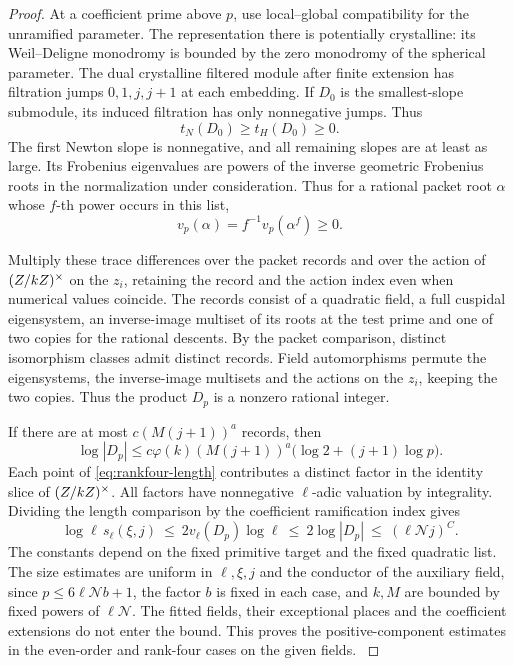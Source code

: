 \begin{proof}
At a coefficient prime
above \(p\), use local--global compatibility for the unramified
parameter. The representation there is potentially crystalline:
its Weil--Deligne monodromy is bounded by the zero monodromy
of the spherical parameter. The dual crystalline filtered
module after finite extension has filtration jumps \(0,1,j,j+1\)
at each embedding. If \(D_0\) is the smallest-slope submodule, its induced filtration has only nonnegative jumps. Thus
\[
 t_N(D_0)\ge t_H(D_0)\ge0 .
\]
The first Newton slope is nonnegative, and all remaining slopes are at least as large. Its Frobenius
eigenvalues are powers of the inverse geometric Frobenius
roots in the normalization under consideration. Thus for a rational packet root \(\alpha\) whose \(f\)-th power occurs in this list,
\[
 v_p(\alpha)=f^{-1}v_p(\alpha^f)\ge0.
\]

\hfill\mbox{\cite{tadic,blggt,blggt-lg,colmez-fontaine}}\label{cor:ordinary-odd-primes-6}

Multiply these trace differences over the packet records and
over the action of \((Z/kZ)^\times\) on the \(z_i\), retaining
the record and the action index even when numerical values
coincide. The records consist of a quadratic field, a full
cuspidal eigensystem, an inverse-image multiset of its roots
at the test prime and one of two copies for the rational
descents. By the packet comparison, distinct isomorphism
classes admit distinct records. Field automorphisms permute
the eigensystems, the inverse-image multisets and the actions
on the \(z_i\), keeping the two copies. Thus the product \(D_p\)
is a nonzero rational integer.

If there are at most
\(c(M(j+1))^a\) records, then
\[
 \log|D_p|\le c\varphi(k)(M(j+1))^a
                  \bigl(\log 2+(j+1)\log p\bigr).
\]
Each point of \eqref{eq:rankfour-length} contributes a distinct
factor in the identity slice of \((Z/kZ)^\times\).
All factors have nonnegative \(\ell\)-adic valuation by
integrality. Dividing the length comparison by the coefficient
ramification index gives
\[
 \log\ell\,s_\ell(\xi,j)
   \ \le\ 2v_\ell(D_p)\log\ell
   \ \le\ 2\log|D_p|
   \ \le\ (\ell\mathcal N j)^C .
\]
The constants depend on the fixed primitive target and
the fixed quadratic list. The size estimates are uniform in
\(\ell,\xi,j\) and the conductor of the auxiliary field, since
\(p\le6\ell\mathcal N b+1\), the factor \(b\) is fixed
in each case, and \(k,M\) are bounded by fixed powers of
\(\ell\mathcal N\). The fitted fields, their exceptional
places and the coefficient extensions do not enter the
bound. This proves the positive-component estimates in the
even-order and rank-four cases on the given fields.
\label{cor:ordinary-odd-primes-7}


\end{proof}
